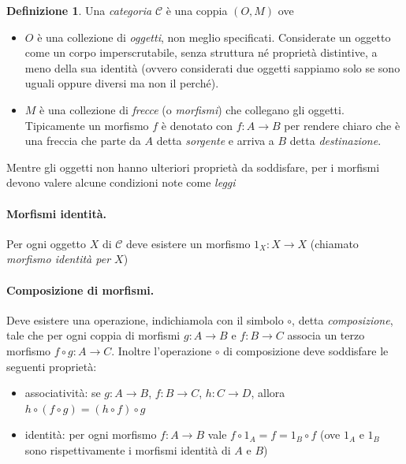 \documentclass[12pt]{article}
\theoremstyle{definition}
\newtheorem{definition}{Definizione}[section]
\begin{document}
\begin{definition}
Una \emph{categoria} $\mathcal{C}$ è una coppia $(O, M)$ ove

\begin{itemize}
  \item $O$ è una collezione di \emph{oggetti}, non meglio specificati. Considerate un oggetto come un corpo imperscrutabile,
  senza struttura né proprietà distintive, a meno della sua identità (ovvero considerati due oggetti sappiamo solo se sono uguali oppure diversi
  ma non il perché).
  \item $M$ è una collezione di \emph{frecce} (o \emph{morfismi}) che collegano gli oggetti. Tipicamente un morfismo $f$ è denotato con $f: A \rightarrow B$
  per rendere chiaro che è una freccia che parte da $A$ detta \emph{sorgente} e arriva a $B$ detta \emph{destinazione}.
\end{itemize}

Mentre gli oggetti non hanno ulteriori proprietà da soddisfare, per i morfismi devono valere alcune condizioni note come \emph{leggi}\\

\paragraph{Morfismi identità.} Per ogni oggetto $X$ di $\mathcal{C}$ deve esistere un morfismo $1_X: X \rightarrow X$ (chiamato \emph{morfismo identità per $X$})\\

\paragraph{Composizione di morfismi.} Deve esistere una operazione, indichiamola con il simbolo $\circ$, detta \emph{composizione}, tale che per ogni coppia di morfismi $g: A \rightarrow B$
e $f: B \rightarrow C$ associa un terzo morfismo $f \circ g: A \rightarrow C$. Inoltre l'operazione $\circ$ di composizione deve soddisfare le seguenti proprietà:

\begin{itemize}
  \item associatività: se $g: A \rightarrow B$, $f: B \rightarrow C$, $h: C \rightarrow D$, allora $h \circ (f \circ g) = (h \circ f) \circ g$
  \item identità: per ogni morfismo $f: A \rightarrow B$ vale $f \circ 1_A = f = 1_B \circ f$ (ove $1_A$ e $1_B$ sono rispettivamente i morfismi identità di $A$ e $B$)
\end{itemize}

\end{definition}
\end{document}
